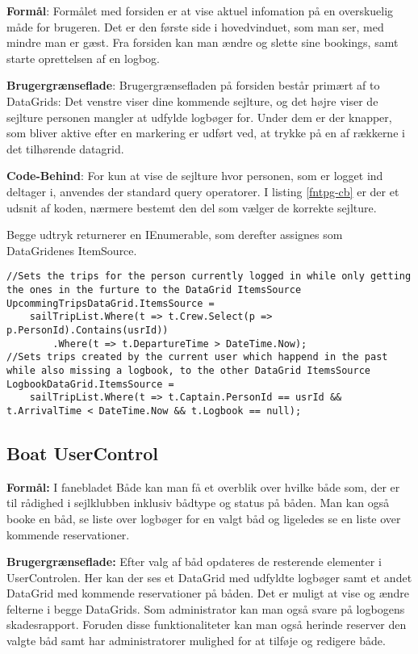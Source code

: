 \textbf{Formål}: 
Formålet med forsiden er at vise aktuel infomation på en overskuelig måde for brugeren.
Det er den første side i hovedvinduet, som man ser, med mindre man er gæst.
Fra forsiden kan man ændre og slette sine bookings, samt starte oprettelsen af en logbog.

\textbf{Brugergrænseflade}: 
Brugergrænsefladen på forsiden består primært af to DataGrids: Det venstre viser dine kommende sejlture, og det højre viser de sejlture personen mangler at udfylde logbøger for. 
Under dem er der knapper, som bliver aktive efter en markering er udført ved, at trykke på en af rækkerne i det tilhørende datagrid.

\textbf{Code-Behind}: 
For kun at vise de sejlture hvor personen, som er logget ind deltager i, anvendes der standard query operatorer. 
I listing \ref{fntpg-cb} er der et udsnit af koden, nærmere bestemt den del som vælger de korrekte sejlture.

Begge udtryk returnerer en IEnumerable, som derefter assignes som DataGridenes ItemSource.

\begin{lstlisting}[frame=single, caption=Forsidens Code-Behind, label=fntpg-cb]
//Sets the trips for the person currently logged in while only getting the ones in the furture to the DataGrid ItemsSource
UpcommingTripsDataGrid.ItemsSource =
    sailTripList.Where(t => t.Crew.Select(p => p.PersonId).Contains(usrId))
        .Where(t => t.DepartureTime > DateTime.Now);
//Sets trips created by the current user which happend in the past while also missing a logbook, to the other DataGrid ItemsSource 
LogbookDataGrid.ItemsSource =
    sailTripList.Where(t => t.Captain.PersonId == usrId && t.ArrivalTime < DateTime.Now && t.Logbook == null);
\end{lstlisting}

\subsection{Boat UserControl}

\textbf{Formål:}
I fanebladet Både kan man få et overblik over hvilke både som, der er til rådighed i sejlklubben inklusiv bådtype og status på båden. 
Man kan også booke en båd, se liste over logbøger for en valgt båd og ligeledes se en liste over kommende reservationer. 

\textbf{Brugergrænseflade:}
Efter valg af båd opdateres de resterende elementer i UserControlen. 
Her kan der ses et DataGrid med udfyldte logbøger samt et andet DataGrid med kommende reservationer på båden.
Det er muligt at vise og ændre felterne i begge DataGrids.
Som administrator kan man også svare på logbogens skadesrapport.
Foruden disse funktionaliteter kan man også herinde reserver den valgte båd samt har administratorer mulighed for at tilføje og redigere både.

